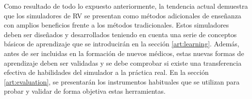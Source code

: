 Como resultado de todo lo expuesto anteriormente, la tendencia actual demuestra que los simuladores de \ac{RV} se presentan como métodos adicionales de enseñanza con amplios beneficios frente a los métodos tradicionales. Estos simuladores deben ser diseñados y desarrollados teniendo en cuenta una serie de conceptos básicos de aprendizaje que se introducirán  en la sección \ref{art:learning}.
Además, antes de ser incluidas en la formación de nuevos médicos, estas nuevas formas de aprendizaje deben ser validadas y se debe comprobar si existe una transferencia efectiva de habilidades del simulador a la práctica real. En la sección \ref{art:evaluation}, se presentarán los instrumentos habituales que se utilizan para probar y validar de forma objetiva estas herramientas.








